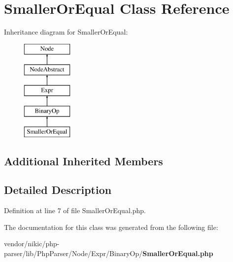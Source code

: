 \section{Smaller\+Or\+Equal Class Reference}
\label{class_php_parser_1_1_node_1_1_expr_1_1_binary_op_1_1_smaller_or_equal}
Inheritance diagram for Smaller\+Or\+Equal\+:\begin{figure}[H]
\begin{center}
\leavevmode
\includegraphics[height=5.000000cm]{class_php_parser_1_1_node_1_1_expr_1_1_binary_op_1_1_smaller_or_equal}
\end{center}
\end{figure}
\subsection*{Additional Inherited Members}


\subsection{Detailed Description}


Definition at line 7 of file Smaller\+Or\+Equal.\+php.



The documentation for this class was generated from the following file\+:\begin{DoxyCompactItemize}
\item 
vendor/nikic/php-\/parser/lib/\+Php\+Parser/\+Node/\+Expr/\+Binary\+Op/{\bf Smaller\+Or\+Equal.\+php}\end{DoxyCompactItemize}
